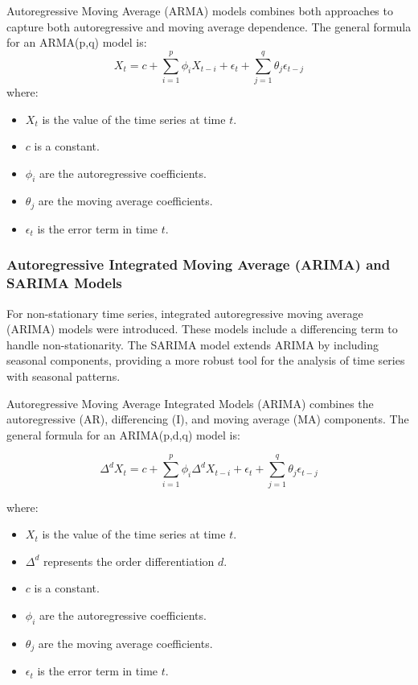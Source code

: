 Autoregressive Moving Average (ARMA) models combines both approaches to capture both autoregressive and moving average dependence. The general formula for an ARMA(p,q) model is:
\begin{equation}
X_t = c + \sum_{i=1}^{p} \phi_i X_{t-i} + \epsilon_t + \sum_{j=1}^{q} \theta_j \epsilon_{t-j}
\end{equation}
where:
\begin{itemize}
    \item \( X_t \) is the value of the time series at time \( t \).
    \item \( c \) is a constant.
    \item \( \phi_i \) are the autoregressive coefficients.
    \item \( \theta_j \) are the moving average coefficients.
    \item \( \epsilon_t \) is the error term in time \( t \).
\end{itemize}
\vspace{10pt}

\subsubsection{Autoregressive Integrated Moving Average (ARIMA) and SARIMA Models}

For non-stationary time series, integrated autoregressive moving average (ARIMA) models were introduced. These models include a differencing term to handle non-stationarity. The SARIMA model extends ARIMA by including seasonal components, providing a more robust tool for the analysis of time series with seasonal patterns.

Autoregressive Moving Average Integrated Models (ARIMA) combines the autoregressive (AR), differencing (I), and moving average (MA) components. The general formula for an ARIMA(p,d,q) model is:

\begin{equation}
\Delta^d X_t = c + \sum_{i=1}^{p} \phi_i \Delta^d X_{t-i} + \epsilon_t + \sum_{j=1}^{q} \theta_j \epsilon_{t-j}
\end{equation}

where:
\begin{itemize}
    \item \( X_t \) is the value of the time series at time \( t \).
    \item \( \Delta^d \) represents the order differentiation \( d \).
    \item \( c \) is a constant.
    \item \( \phi_i \) are the autoregressive coefficients.
    \item \( \theta_j \) are the moving average coefficients.
    \item \( \epsilon_t \) is the error term in time \( t \).
\end{itemize}

